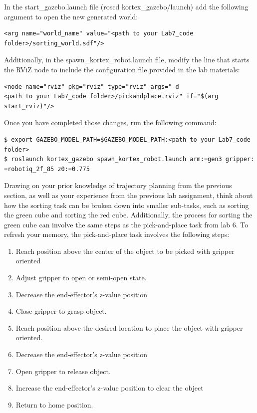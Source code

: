 \documentclass[12pt]{article}
\begin{document}
In the start\_gazebo.launch file (roscd kortex\_gazebo/launch) add the following argument to open the new generated world:

\begin{verbatim}
<arg name="world_name" value="<path to your Lab7_code folder>/sorting_world.sdf"/>
\end{verbatim}

Additionally, in the spawn\_kortex\_robot.launch file, modify the line that starts the RViZ node to include the configuration file provided in the lab materials:

\begin{verbatim}
<node name="rviz" pkg="rviz" type="rviz" args="-d 
<path to your Lab7_code folder>/pickandplace.rviz" if="$(arg start_rviz)"/>
\end{verbatim}

Once you have completed those changes, run the following command:

\begin{verbatim}
$ export GAZEBO_MODEL_PATH=$GAZEBO_MODEL_PATH:<path to your Lab7_code folder>
$ roslaunch kortex_gazebo spawn_kortex_robot.launch arm:=gen3 gripper:
=robotiq_2f_85 z0:=0.775
\end{verbatim}

Drawing on your prior knowledge of trajectory planning from the previous section, as well as your experience from the previous lab assignment, think about how the sorting task can be broken down into smaller sub-tasks, such as sorting the green cube and sorting the red cube. Additionally, the process for sorting the green cube can involve the same steps as the pick-and-place task from lab 6. To refresh your memory, the pick-and-place task involves the following steps:

\begin{enumerate}
    \item Reach position above the center of the object to be picked with gripper oriented
    \item Adjust gripper to open or semi-open state.
    \item Decrease the end-effector’s z-value position
    \item Close gripper to grasp object.
    \item Reach position above the desired location to place the object with gripper oriented.
    \item Decrease the end-effector’s z-value position
    \item Open gripper to release object.
    \item Increase the end-effector’s z-value position to clear the object
    \item Return to home position.
    
\end{enumerate}
\end{document}
